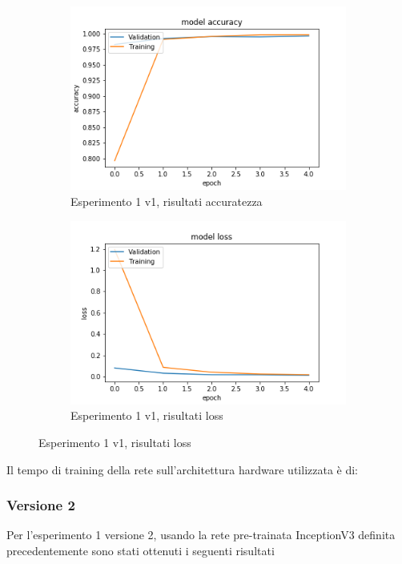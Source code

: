 \begin{figure}[H]
    \begin{subfigure}[b]{0.5\textwidth}
        \includegraphics[width=\textwidth]{./plots/exp1_p1_bestmodel_acc.png}
        \caption{Esperimento 1 v1, risultati accuratezza} 
        \label{fig:plot_exp1_p1_acc}
    \end{subfigure}
    \begin{subfigure}[b]{0.5\textwidth}
        \includegraphics[width=\textwidth]{./plots/exp1_p1_bestmodel_loss.png}
        \caption{Esperimento 1 v1, risultati loss} 
        \label{fig:plot_exp1_p1_loss}
	\end{subfigure}
\end{figure}

Il tempo di training della rete sull'architettura hardware utilizzata è di:

\subsubsection{Versione 2}
Per l'esperimento 1 versione 2, usando la rete pre-trainata InceptionV3 definita precedentemente sono stati ottenuti i seguenti risultati

